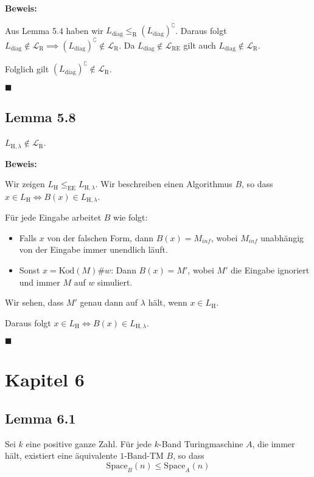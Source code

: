 \documentclass[a4paper, 11pt]{article}
\def\Lre{\mathcal{L}_\text{RE}}
\def\Lr{\mathcal{L}_\text{R}}
\begin{document}
    \textbf{Beweis:} 
    
    Aus Lemma 5.4 haben wir $L_\text{diag} \leq_\text{R} (L_\text{diag})^\complement$. Daraus folgt $L_\text{diag} \notin \Lr \implies (L_\text{diag})^\complement \notin \Lr$.
    Da $L_\text{diag} \notin \Lre$ gilt auch $L_\text{diag} \notin \Lr$. 
    
    Folglich gilt $(L_\text{diag})^\complement \notin \Lr$.

    \hspace*{0pt}\hfill$\blacksquare$

    
   
    \subsection*{Lemma 5.8}
    $L_{\text{H}, \lambda} \notin \Lr$.

    \textbf{Beweis: }

    Wir zeigen $L_\text{H} \leq_\text{EE} L_{\text{H}, \lambda}$. Wir beschreiben einen Algorithmus $B$, so dass $x \in L_\text{H} \iff B(x) \in L_{\text{H}, \lambda}$.

    Für jede Eingabe arbeitet $B$ wie folgt:
    \begin{itemize}
        \item Falls $x$ von der falschen Form, dann $B(x) = M_{inf}$, wobei $M_{inf}$ unabhängig von der Eingabe immer unendlich läuft.
        \item Sonst $x = \text{Kod}(M)\#w$: Dann $B(x) = M'$, wobei $M'$ die Eingabe ignoriert und immer $M$ auf $w$ simuliert.
    \end{itemize}

    Wir sehen, dass $M'$ genau dann auf $\lambda$ hält, wenn $x \in L_{\text{H}}$.

    Daraus folgt $x \in L_\text{H} \iff B(x) \in L_{\text{H}, \lambda}$.

    \hspace*{0pt}\hfill$\blacksquare$

    \section*{Kapitel 6}
    
    \subsection*{Lemma 6.1}
    Sei $k$ eine positive ganze Zahl. Für jede $k$-Band Turingmaschine $A$, die immer hält, existiert eine äquivalente $1$-Band-TM $B$, so dass
    $$\text{Space}_B(n) \leq \text{Space}_A(n)$$
\end{document}
